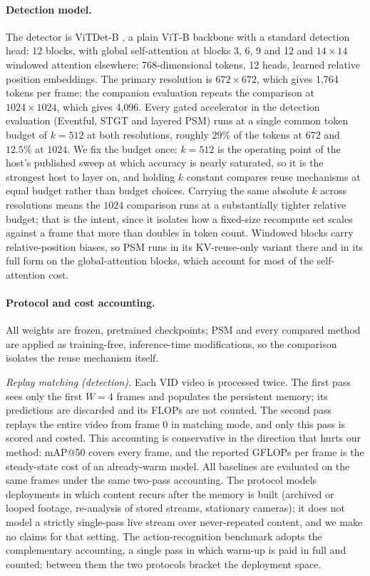 \paragraph{Detection model.}
The detector is ViTDet-B \cite{vitdet}, a plain ViT-B backbone \cite{vit}
with a standard detection head: 12 blocks, with global self-attention at
blocks 3, 6, 9 and 12 and $14 \times 14$ windowed attention elsewhere;
768-dimensional tokens, 12 heads, learned relative position embeddings.
The primary resolution is $672 \times 672$, which gives 1{,}764 tokens
per frame; the companion evaluation repeats the comparison at
$1024 \times 1024$, which gives 4{,}096. Every gated accelerator in the
detection evaluation (Eventful, STGT and layered PSM) runs at a single
common token budget of $k = 512$ at both resolutions, roughly $29\%$ of
the tokens at $672$ and $12.5\%$ at $1024$. We fix the budget once:
$k = 512$ is the operating point of the host's published sweep at which
accuracy is nearly saturated, so it is the strongest host to layer on,
and holding $k$ constant compares reuse mechanisms at equal budget
rather than budget choices. Carrying the same absolute $k$ across
resolutions means the $1024$ comparison runs at a substantially tighter
relative budget; that is the intent, since it isolates how a
fixed-size recompute set scales against a frame that more than doubles
in token count.
Windowed blocks carry relative-position biases, so PSM runs in its
KV-reuse-only variant there and in its full form on the global-attention
blocks, which account for most of the self-attention cost.

\paragraph{Protocol and cost accounting.}
All weights are frozen, pretrained checkpoints; PSM and every compared
method are applied as training-free, inference-time modifications, so
the comparison isolates the reuse mechanism itself.

\emph{Replay matching (detection).} Each VID video is processed twice.
The first pass sees only the first $W = 4$ frames and populates the
persistent memory; its predictions are discarded and its FLOPs are not
counted. The second pass replays the entire video from frame 0 in
matching mode, and only this pass is scored and costed. This accounting
is conservative in the direction that hurts our method: mAP@50 covers
every frame, and the reported GFLOPs per frame is the steady-state cost
of an already-warm model. All baselines are evaluated on the same frames
under the same two-pass accounting. The protocol models deployments in
which content recurs after the memory is built (archived or looped
footage, re-analysis of stored streams, stationary cameras); it does
not model a strictly single-pass live stream over never-repeated
content, and we make no claims for that setting. The action-recognition
benchmark adopts the complementary accounting, a single pass in which
warm-up is paid in full and counted; between them the two protocols
bracket the deployment space.

